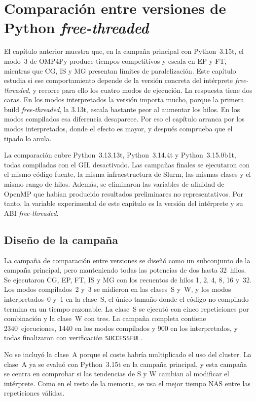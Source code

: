 \chapter{Comparación entre versiones de Python \emph{free-threaded}}
\label{chap:versiones}

El capítulo anterior muestra que, en la campaña principal con Python~3.15t, el
modo~3 de OMP4Py produce tiempos competitivos y escala en EP y FT, mientras que
CG, IS y MG presentan límites de paralelización. Este capítulo estudia si ese
comportamiento depende de la versión concreta del intérprete
\emph{free-threaded}, y recorre para ello los cuatro modos de ejecución. La
respuesta tiene dos caras. En los modos interpretados la versión importa mucho,
porque la primera build \emph{free-threaded}, la 3.13t, escala bastante peor al
aumentar los hilos. En los modos compilados esa diferencia desaparece. Por eso el
capítulo arranca por los modos interpretados, donde el efecto es mayor, y después
comprueba que el tipado lo anula.

La comparación cubre Python~3.13.13t, Python~3.14.4t y Python~3.15.0b1t,
todas compiladas con el GIL desactivado. Las campañas finales se ejecutaron con
el mismo código fuente, la misma infraestructura de Slurm, las mismas clases y
el mismo rango de hilos. Además, se eliminaron las variables de afinidad de
OpenMP que habían producido resultados preliminares no representativos. Por
tanto, la variable experimental de este capítulo es la versión del intérprete y
su ABI \emph{free-threaded}.


\section{Diseño de la campaña}
\label{sec:versiones-diseno}

La campaña de comparación entre versiones se diseñó como un subconjunto de la
campaña principal, pero manteniendo todas las potencias de dos hasta 32~hilos.
Se ejecutaron CG, EP, FT, IS y MG con los recuentos de hilos 1, 2, 4, 8, 16
y~32. Los modos compilados~2 y~3 se midieron en las clases~S y~W, y los modos
interpretados~0 y~1 en la clase~S, el único tamaño donde el código no compilado
termina en un tiempo razonable. La clase~S se ejecutó con cinco repeticiones por
combinación y la clase~W con tres. La campaña completa contiene
2340~ejecuciones, 1440 en los modos compilados y 900 en los interpretados, y
todas finalizaron con verificación \texttt{SUCCESSFUL}.

No se incluyó la clase~A porque el coste habría multiplicado el uso del cluster.
La clase~A ya se evaluó con Python~3.15t en la campaña principal, y esta campaña
se centra en comprobar si las tendencias de S y W cambian al modificar el
intérprete. Como en el resto de la memoria, se usa el mejor tiempo NAS entre las
repeticiones válidas.


